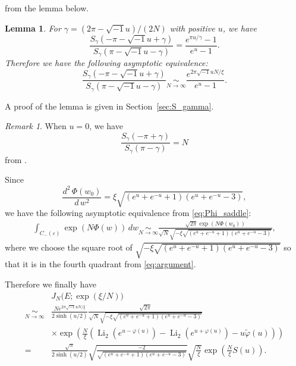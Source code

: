 \documentclass[a4paper]{amsart}
\theoremstyle{plain}
\newtheorem{lem}[thm]{Lemma}
\theoremstyle{definition}
\theoremstyle{remark}
\newtheorem{rem}[thm]{Remark}
\newcommand{\Li}{\operatorname{Li}}
\numberwithin{equation}{section}
\begin{document}
from the lemma below.
\begin{lem}\label{lem:S_gamma}
For $\gamma=(2\pi-\sqrt{-1}u)/(2N)$ with positive $u$, we have
\begin{equation*}
  \frac{S_{\gamma}(-\pi-\sqrt{-1}u+\gamma)}{S_{\gamma}(\pi-\sqrt{-1}u-\gamma)}
  =
  \frac{e^{\pi u/\gamma}-1}{e^u-1}.
\end{equation*}
Therefore we have the following asymptotic equivalence:
\begin{equation*}
  \frac{S_{\gamma}(-\pi-\sqrt{-1}u+\gamma)}{S_{\gamma}(\pi-\sqrt{-1}u-\gamma)}
  \underset{N\to\infty}{\sim}
  \frac{e^{2\pi\sqrt{-1}u N/\xi}}{e^u-1}.
\end{equation*}
\end{lem}
A proof of the lemma is given in Section~\ref{sec:S_gamma}.
\begin{rem}\label{rem:S}
When $u=0$, we have
\begin{equation*}
  \frac{S_{\gamma}(-\pi+\gamma)}{S_{\gamma}(\pi-\gamma)}
  =
  N
\end{equation*}
from \cite[P.~492]{Andersen/Hansen:JKNOT2006}.
\end{rem}
\par
Since
\begin{equation*}
  \frac{d^2\,\Phi(w_0)}{d\,w^2}
  =
  \xi\sqrt{(e^u+e^{-u}+1)(e^u+e^{-u}-3)},
\end{equation*}
we have the following asymptotic equivalence from \eqref{eq:Phi_saddle}:
\begin{equation*}
\begin{split}
  \int_{C_{-}(\varepsilon)}\exp(N\Phi(w))\,dw
  \underset{N\to\infty}{\sim}
  \frac{\sqrt{2\pi}\exp(N\Phi(w_0))}
  {\sqrt{N}\sqrt{-\xi\sqrt{(e^u+e^{-u}+1)(e^u+e^{-u}-3)}}},
\end{split}
\end{equation*}
where we choose the square root of $\sqrt{-\xi\sqrt{(e^u+e^{-u}+1)(e^u+e^{-u}-3)}}$ so that it is in the fourth quadrant from \eqref{eq:argument}.
\par
Therefore we finally have
\begin{equation*}
\begin{split}
  &J_N\bigl(E;\exp(\xi/N)\bigr)
  \\
  \underset{N\to\infty}{\sim}&
  \frac{N e^{2\pi\sqrt{-1}u N/\xi}}{2\sinh(u/2)}
  \frac{\sqrt{2\pi}}{\sqrt{N}\sqrt{-\xi\sqrt{(e^u+e^{-u}+1)(e^u+e^{-u}-3)}}}
  \\
  &
  \times
  \exp
  \left(
    \frac{N}{\xi}
    \left(
      \Li_2\left(e^{u-\varphi(u)}\right)
      -
      \Li_2\left(e^{u+\varphi(u)}\right)
      -
      u\tilde{\varphi}(u)
    \right)
  \right)
  \\
  =&
  \frac{\sqrt{\pi}}{2\sinh(u/2)}
  \sqrt{
    \frac{-2}{\sqrt{(e^u+e^{-u}+1)(e^u+e^{-u}-3)}}
       }
  \sqrt{\frac{N}{\xi}}
  \exp\left(\frac{N}{\xi}S(u)\right).
\end{split}
\end{equation*}
\end{document}

